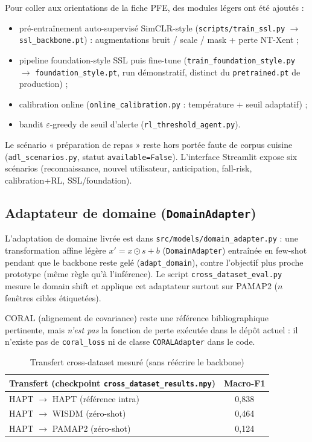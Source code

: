 Pour coller aux orientations de la fiche PFE, des modules légers ont été
ajoutés :
\begin{itemize}
  \item pré-entraînement auto-supervisé SimCLR-style
  (\texttt{scripts/train\_ssl.py} $\rightarrow$ \texttt{ssl\_backbone.pt}) :
  augmentations bruit / scale / mask + perte NT-Xent ;
  \item pipeline foundation-style SSL puis fine-tune
  (\texttt{train\_foundation\_style.py} $\rightarrow$ \texttt{foundation\_style.pt},
  run démonstratif, distinct du \texttt{pretrained.pt} de production) ;
  \item calibration online
  (\texttt{online\_calibration.py} : température + seuil adaptatif) ;
  \item bandit $\varepsilon$-greedy de seuil d'alerte
  (\texttt{rl\_threshold\_agent.py}).
\end{itemize}
Le scénario « préparation de repas » reste hors portée faute de corpus cuisine
(\texttt{adl\_scenarios.py}, statut \texttt{available=False}). L'interface
Streamlit expose six scénarios (reconnaissance, nouvel utilisateur,
anticipation, fall-risk, calibration+RL, SSL/foundation).

\subsection{Adaptateur de domaine (\texttt{DomainAdapter})}

L'adaptation de domaine livrée est dans \texttt{src/models/domain\_adapter.py} :
une transformation affine légère $x' = x \odot s + b$ (\texttt{DomainAdapter})
entraînée en few-shot pendant que le backbone reste gelé
(\texttt{adapt\_domain}), contre l'objectif plus proche prototype (même règle
qu'à l'inférence). Le script \texttt{cross\_dataset\_eval.py} mesure le
domain shift et applique cet adaptateur surtout sur PAMAP2 ($n$ fenêtres
cibles étiquetées).

CORAL \parencite{sun2016} (alignement de covariance) reste une référence
bibliographique pertinente, mais \emph{n'est pas} la fonction de perte
exécutée dans le dépôt actuel : il n'existe pas de \texttt{coral\_loss} ni de
classe \texttt{CORALAdapter} dans le code.

\begin{table}[H]
\centering
\small
\begin{tabularx}{0.88\textwidth}{|Y|c|}
\hline
\textbf{Transfert (checkpoint \texttt{cross\_dataset\_results.npy})} & \textbf{Macro-F1} \\
\hline
HAPT $\rightarrow$ HAPT (référence intra) & 0,838 \\
HAPT $\rightarrow$ WISDM (zéro-shot) & 0,464 \\
HAPT $\rightarrow$ PAMAP2 (zéro-shot) & 0,124 \\
\hline
\end{tabularx}
\caption{Transfert cross-dataset mesuré (sans réécrire le backbone)}
\label{tab:coral_impl}
\end{table}

